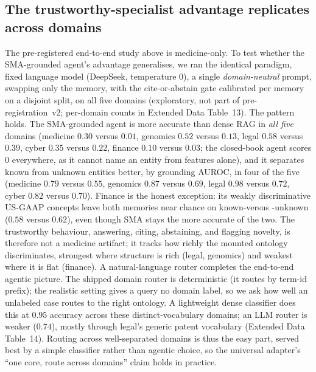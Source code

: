 \documentclass[pdflatex,sn-nature]{sn-jnl}
\begin{document}
\subsection{The trustworthy-specialist advantage replicates across domains}
The pre-registered end-to-end study above is medicine-only. To test whether the
SMA-grounded agent's advantage generalises, we ran the identical paradigm, fixed
language model (DeepSeek, temperature $0$), a single \emph{domain-neutral} prompt,
swapping only the memory, with the cite-or-abstain gate calibrated per memory on a
disjoint split, on all five domains (exploratory, not part of pre-registration~v2;
per-domain counts in Extended Data Table~13). The pattern holds. The SMA-grounded
agent is more accurate than dense RAG in \emph{all five} domains (medicine $0.30$
versus $0.01$, genomics $0.52$ versus $0.13$, legal $0.58$ versus $0.39$, cyber
$0.35$ versus $0.22$, finance $0.10$ versus $0.03$; the closed-book agent scores
$0$ everywhere, as it cannot name an entity from features alone), and it separates
known from unknown entities better, by grounding AUROC, in four of the five
(medicine $0.79$ versus $0.55$, genomics $0.87$ versus $0.69$, legal $0.98$ versus
$0.72$, cyber $0.82$ versus $0.70$). Finance is the honest exception: its weakly
discriminative US-GAAP concepts leave both memories near chance on known-versus
-unknown ($0.58$ versus $0.62$), even though SMA stays the more accurate of the
two. The trustworthy behaviour, answering, citing, abstaining, and flagging
novelty, is therefore not a medicine artifact; it tracks how richly the mounted
ontology discriminates, strongest where structure is rich (legal, genomics) and
weakest where it is flat (finance). A natural-language router completes the
end-to-end agentic picture. The shipped domain router is deterministic (it routes
by term-id prefix); the realistic setting gives a query no domain label, so we ask
how well an unlabeled case routes to the right ontology. A lightweight dense
classifier does this at $0.95$ accuracy across these distinct-vocabulary domains;
an LLM router is weaker ($0.74$), mostly through legal's generic patent vocabulary
(Extended Data Table~14). Routing across well-separated domains is thus the easy
part, served best by a simple classifier rather than agentic choice, so the
universal adapter's ``one core, route across domains'' claim holds in practice.
\end{document}
